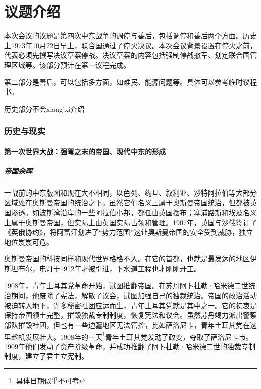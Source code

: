 \documentclass{article}
\begin{document}
\part{议题介绍}
本次会议的议题是第四次中东战争的调停与善后，包括调停和善后两个方面。历史上1973年10月22日早上，联合国通过了停火决议。本次会议背景设置在停火之前，代表必须先撰写决议草案停战。决议草案的内容包括强制停战撤军、划定联合国管理区域等。该部分预计在第一议程完成。

第二部分是善后，可以包括多方面，如难民、能源问题等。具体可以参考临时议程书。

历史部分不会xiang'xi介绍
\section{历史与现实}
\subsection{第一次世界大战：强弩之末的帝国、现代中东的形成}
\subsubsection{帝国余晖}
一战前的中东版图和现在大不相同，以色列、约旦、叙利亚、沙特阿拉伯等大部分区域处在奥斯曼帝国的统治之下。虽然它们名义上属于奥斯曼帝国统治，但都被英国渗透。如波斯湾沿岸的一些阿拉伯小邦，都任由英国摆布；塞浦路斯和埃及名义上属于奥斯曼帝国，但实际上由英国实际占领和管理。1907年，英国与沙俄签订了《英俄协约》，将阿富汗划进了“势力范围”这让奥斯曼帝国的安全受到威胁，独立地位岌岌可危。

奥斯曼帝国的科技同样和现代世界格格不入。在它的首都，也就是最发达的地区伊斯坦布尔，电灯于1912年才被引进，下水道工程也才刚刚开工。

1908年，青年土耳其党革命开始，试图推翻帝国。在苏丹阿卜杜勒·哈米德二世统治期间，他废除了宪法，解散了议会，试图加强自己的独裁统治。帝国的政治活动被迫转入地下，许多秘密社团应运而生，青年土耳其党就是其中之一。它的初衷是保持帝国领土完整，摧毁独裁专制制度，恢复宪法和议会。虽然苏丹竭力派出警察部队摧毁社团，但也有一些边疆地区无法管控，比如萨洛尼卡，青年土耳其党在这里趁机发展壮大。1908年的一天\footnote{具体日期似乎不可考}青年土耳其党发动了政变，夺取了萨洛尼卡市。1909年他们发动了资产阶级革命，并成功推翻了阿卜杜勒·哈米德二世的独裁专制制度，建立了君主立宪制。
\end{document}
